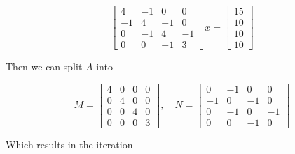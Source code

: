 \[
    \begin{bmatrix}
        4 & -1 & 0 & 0 \\ 
        -1 & 4 & -1 & 0 \\ 
        0 & -1 & 4 & -1 \\ 
        0 & 0 & -1 & 3
    \end{bmatrix}
    x = 
    \begin{bmatrix}
        15 \\ 
        10 \\ 
        10 \\ 
        10
    \end{bmatrix}
\]

Then we can split \(A\) into

\[
    M = 
    \begin{bmatrix}
        4 & 0 & 0 & 0 \\ 
        0 & 4 & 0 & 0 \\ 
        0 & 0 & 4 & 0 \\ 
        0 & 0 & 0 & 3
    \end{bmatrix}
    , \quad 
    N = 
    \begin{bmatrix}
        0 & -1 & 0 & 0 \\ 
        -1 & 0 & -1 & 0 \\ 
        0 & -1 & 0 & -1 \\ 
        0 & 0 & -1 & 0
    \end{bmatrix}
\]

Which results in the iteration

